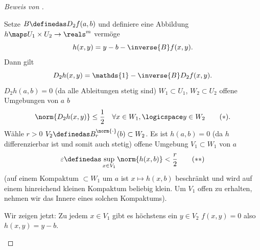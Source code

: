 \begin{proof}[Beweis von ]
  \begin{proofenumerate}[label=\rechtsklammer{\arabic*}]
    Setze \( B\definedas D_2f(a,b)\) und definiere eine Abbildung \( h\maps U_1\times U_2\to \reals^m \) vermöge
    \begin{equation*}
      h(x,y)=y-b-\inverse{B} f(x,y).
    \end{equation*}
    Dann gilt 
    \begin{equation*}
      D_2 h(x,y)=\mathds{1}-\inverse{B} D_2 f(x,y).
    \end{equation*}
    \timplies \( D_2 h(a,b)=0 \) \timplies (da alle Ableitungen stetig sind) \texists \( W_1\subset U_1 \), \( W_2\subset U_2 \) offene Umgebungen von \( a \) \bzw \( b \) \sd
    \begin{equation*}
    \norm{D_2 h(x,y)}\leq \frac{1}{2}\quad \forall x\in W_1,\logicspace y\in W_2\tag{\(*\)}.\label{satz_von_der_impliziten_funktion:beweis:h:ableitungsnorm_bschraenkt}
    \end{equation*}
    Wähle \( r>0 \) \sd \( V_2\definedas B_r^{\norm{\cdot}}(b)\subset W_2 \). Es ist \( h(a,b)=0 \) \timplies (da \( h \) differenzierbar ist und somit auch stetig) \texists offene Umgebung \( V_1\subset W_1 \) von \( a \) \sd 
    \begin{equation*}
      \varepsilon\definedas \sup_{x\in V_1}\norm{h(x,b)}<\frac{r}{2} \tag{\( ** \)}\label{satz_von_der_impliziten_funktion:beweis:h:norm_beschraenkt}
    \end{equation*}
    (auf einem Kompaktum \( \subset W_1 \) um \( a \) ist \( x\mapsto h(x,b) \) beschränkt und wird auf einem hinreichend kleinen Kompaktum beliebig klein. Um \( V_1 \) offen zu erhalten, nehmen wir das Innere eines solchen Kompaktums).
    \item Wir zeigen jetzt: Zu jedem \( x\in V_1 \) gibt es höchstens ein \( y\in V_2 \) \sd \( f(x,y)=0 \) also \sd \( h(x,y)=y-b \).
    

\end{proofenumerate}
\end{proof}
